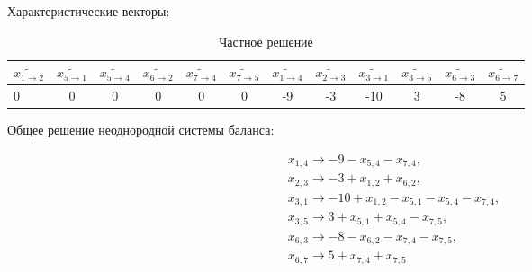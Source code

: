 \documentclass[a4paper,14pt,usenames,dvipsnames]{extreport}
\begin{document}
Характеристические векторы:


\begin{table}[H] 
\renewcommand{\arraystretch}{1.3}
\caption{Частное решение } \label{tab:t11}
\begin{center}
\begin{tabular}{|l|c|c|c|c|c|c|c|c|c|c|c|}
\hline

$\tilde{x_{1 \rightarrow 2}}$ & $\tilde{x_{5 \rightarrow 1}}$ & $\tilde{x_{5 \rightarrow 4}}$ & $\tilde{x_{6 \rightarrow 2}}$ & $\tilde{x_{7 \rightarrow 4}}$ & $\tilde{x_{7 \rightarrow 5}}$ & $\tilde{x_{1 \rightarrow 4}}$ & $\tilde{x_{2 \rightarrow 3}}$ & $\tilde{x_{3 \rightarrow 1}}$ & $\tilde{x_{3 \rightarrow 5}}$ & $\tilde{x_{6 \rightarrow 3}}$ & $\tilde{x_{6 \rightarrow 7}}$ \\ \hline

0 & 0 & 0 & 0 & 0 & 0 & -9 & -3 & -10 & 3 & -8 & 5 \\ \hline

\end{tabular}
\end{center}
\end{table}

Общее решение неоднородной системы баланса:

\begin{gather*}
x_{1,4} \rightarrow -9 - x_{5,4} - x_{7,4},\\
x_{2,3} \rightarrow -3 + x_{1,2} + x_{6,2},\\
x_{3,1} \rightarrow -10 + x_{1,2} - x_{5,1} - x_{5,4} - x_{7,4}, \\
x_{3,5} \rightarrow 3 + x_{5,1} + x_{5,4} - x_{7,5},\\
x_{6,3} \rightarrow -8 - x_{6,2} - x_{7,4} - x_{7,5},\\
x_{6,7} \rightarrow 5 + x_{7,4} + x_{7,5} \\
\end{gather*}
\end{document}
